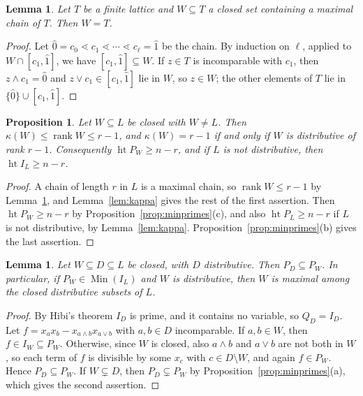 \documentclass{amsart}
\newtheorem{lemma}[theorem]{Lemma}
\newtheorem{proposition}[theorem]{Proposition}
\theoremstyle{definition}
\DeclareMathOperator{\rk}{rank}
\DeclareMathOperator{\htop}{ht}
\DeclareMathOperator{\Min}{Min}
\begin{document}
\begin{lemma}\label{lem:maxchain}
	Let $T$ be a finite lattice and $W\subseteq T$ a closed set containing a maximal chain of $T$. Then $W=T$.
\end{lemma}

\begin{proof}
	Let $\hat0=c_0\lessdot c_1\lessdot\cdots\lessdot c_\ell=\hat1$ be the chain. By induction on $\ell$, applied to $W\cap[c_1,\hat1]$, we have $[c_1,\hat1]\subseteq W$. If $z\in T$ is incomparable with $c_1$, then $z\wedge c_1=\hat0$ and $z\vee c_1\in[c_1,\hat1]$ lie in $W$, so $z\in W$; the other elements of $T$ lie in $\{\hat0\}\cup[c_1,\hat1]$.
\end{proof}

\begin{proposition}\label{prop:general}
	Let $W\subseteq L$ be closed with $W\ne L$. Then $\kappa(W)\le\rk W\le r-1$, and $\kappa(W)=r-1$ if and only if $W$ is distributive of rank $r-1$. Consequently $\htop P_W\ge n-r$, and if $L$ is not distributive, then $\htop I_L\ge n-r$.
\end{proposition}

\begin{proof}
	A chain of length $r$ in $L$ is a maximal chain, so $\rk W\le r-1$ by Lemma~\ref{lem:maxchain}, and Lemma~\ref{lem:kappa} gives the rest of the first assertion. Then $\htop P_W\ge n-r$ by Proposition~\ref{prop:minprimes}(c), and also $\htop P_L\ge n-r$ if $L$ is not distributive, by Lemma~\ref{lem:kappa}. Proposition~\ref{prop:minprimes}(b) gives the last assertion.
\end{proof}

\begin{lemma}\label{lem:hibi}
	Let $W\subseteq D\subseteq L$ be closed, with $D$ distributive. Then $P_D\subseteq P_W$. In particular, if $P_W\in\Min(I_L)$ and $W$ is distributive, then $W$ is maximal among the closed distributive subsets of $L$.
\end{lemma}

\begin{proof}
	By Hibi's theorem $I_D$ is prime, and it contains no variable, so $Q_D=I_D$. Let $f=x_ax_b-x_{a\wedge b}x_{a\vee b}$ with $a,b\in D$ incomparable. If $a,b\in W$, then $f\in I_W\subseteq P_W$. Otherwise, since $W$ is closed, also $a\wedge b$ and $a\vee b$ are not both in $W$, so each term of $f$ is divisible by some $x_c$ with $c\in D\setminus W$, and again $f\in P_W$. Hence $P_D\subseteq P_W$. If $W\subsetneq D$, then $P_D\subsetneq P_W$ by Proposition~\ref{prop:minprimes}(a), which gives the second assertion.
\end{proof}
\end{document}
